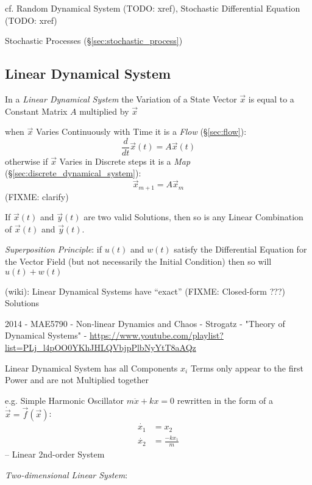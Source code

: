 cf. Random Dynamical System (TODO: xref), Stochastic Differential Equation
(TODO: xref)

\fist Stochastic Processes (\S\ref{sec:stochastic_process})



\subsection{Linear Dynamical System}\label{sec:linear_dynamical_system}

In a \emph{Linear Dynamical System} the Variation of a State Vector $\vec{x}$
is equal to a Constant Matrix $A$ multiplied by $\vec{x}$

when $\vec{x}$ Varies Continuously with Time it is a \emph{Flow}
(\S\ref{sec:flow}):
\[
  \frac{d}{dt}\vec{x}(t) = A\vec{x}(t)
\]
otherwise if $\vec{x}$ Varies in Discrete steps it is a \emph{Map}
(\S\ref{sec:discrete_dynamical_system}):
\[
  \vec{x}_{m+1} = A\vec{x}_m
\]
(FIXME: clarify)

If $\vec{x}(t)$ and $\vec{y}(t)$ are two valid Solutions, then so is any Linear
Combination of $\vec{x}(t)$ and $\vec{y}(t)$.

\emph{Superposition Principle}: if $u(t)$ and $w(t)$ satisfy the Differential
Equation for the Vector Field (but not necessarily the Initial Condition) then
so will $u(t) + w(t)$

(wiki): Linear Dynamical Systems have ``exact'' (FIXME: Closed-form ???)
Solutions

\asterism

2014 - MAE5790 - Non-linear Dynamics and Chaos - Strogatz - "Theory of
Dynamical Systems" -
\url{https://www.youtube.com/playlist?list=PLj_l4pOO0YKhJHLQVbjpPlbNyYtT8aAQz}

Linear Dynamical System has all Components $x_i$ Terms only appear to the first
Power and are not Multiplied together

e.g. Simple Harmonic Oscillator $m\ddot{x} + kx = 0$
rewritten in the form of a $\dot{\vec{x}} = \vec{f}(\vec{x})$:
\begin{align*}
  \dot{x_1} & = x_2 \\
  \dot{x_2} & = \frac{-kx_1}{m}
\end{align*}
-- Linear 2nd-order System

\emph{Two-dimensional Linear System}:

